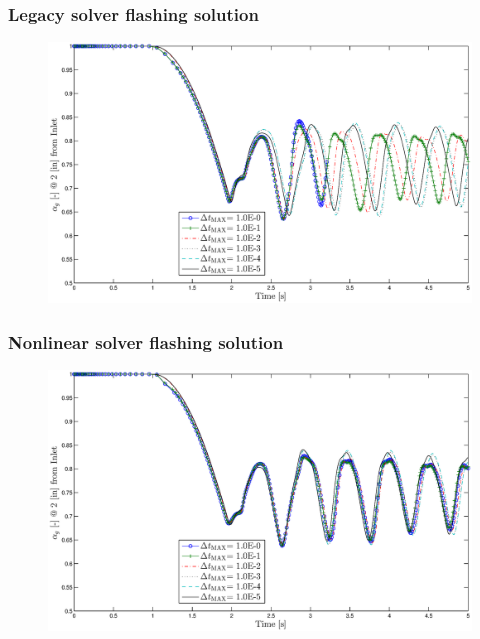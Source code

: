 \documentclass[compress,xcolor=table]{beamer}
\begin{document}
\begin{frame}
\frametitle{Legacy solver flashing solution}

\begin{figure}[h!t]
\centering
\includegraphics[width=.94\textwidth]{images/cobra_flashing_al_2in.eps}
\end{figure}

\end{frame}
\begin{frame}
\frametitle{Nonlinear solver flashing solution}

\begin{figure}[h!t]
\centering
\includegraphics[width=.94\textwidth]{images/nl_flashing_al_2in.eps}
\end{figure}

\end{frame}
\end{document}
